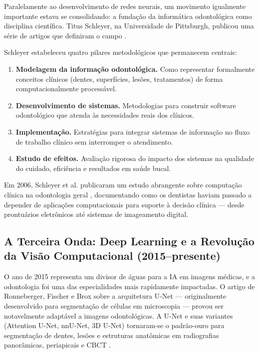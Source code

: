 Paralelamente ao desenvolvimento de redes neurais, um movimento igualmente importante estava se consolidando: a fundação da informática odontológica como disciplina científica. Titus Schleyer, na Universidade de Pittsburgh, publicou uma série de artigos que definiram o campo \cite{ODT-004, ODT-007}.


Schleyer \cite{ODT-007, ODT-004, ODT-006} estabeleceu quatro pilares metodológicos que permanecem centrais:

\begin{enumerate}
    \item \textbf{Modelagem da informação odontológica.} Como representar formalmente conceitos clínicos (dentes, superfícies, lesões, tratamentos) de forma computacionalmente processável.
    \item \textbf{Desenvolvimento de sistemas.} Metodologias para construir software odontológico que atenda às necessidades reais dos clínicos.
    \item \textbf{Implementação.} Estratégias para integrar sistemas de informação no fluxo de trabalho clínico sem interromper o atendimento.
    \item \textbf{Estudo de efeitos.} Avaliação rigorosa do impacto dos sistemas na qualidade do cuidado, eficiência e resultados em saúde bucal.
\end{enumerate}

Em 2006, Schleyer et al. publicaram um estudo abrangente sobre computação clínica na odontologia geral \cite{ODT-006}, documentando como os dentistas haviam passado a depender de aplicações computacionais para suporte à decisão clínica — desde prontuários eletrônicos até sistemas de imageamento digital.

\subsection{A Terceira Onda: Deep Learning e a Revolução da Visão Computacional (2015--presente)}

O ano de 2015 representa um divisor de águas para a IA em imagens médicas, e a odontologia foi uma das especialidades mais rapidamente impactadas. O artigo de Ronneberger, Fischer e Brox sobre a arquitetura U-Net \cite{ronneberger2015u} — originalmente desenvolvido para segmentação de células em microscopia — provou ser notavelmente adaptável a imagens odontológicas. A U-Net e suas variantes (Attention U-Net, nnU-Net, 3D U-Net) tornaram-se o padrão-ouro para segmentação de dentes, lesões e estruturas anatômicas em radiografias panorâmicas, periapicais e CBCT .

